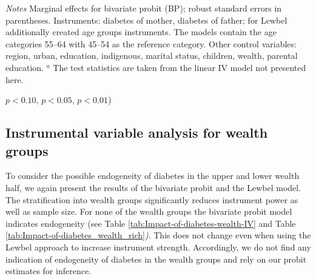 \begin{table}[ph]
\begin{center}
\begin{adjustbox}{max width=\textwidth, center}
\begin{threeparttable}
{\begin{tabular}{l*{4}{S S}}
\end{tabular}
\begin{tablenotes}
\item \textit{Notes}  Marginal effects for bivariate probit (BP); robust standard errors in parentheses. Instruments: diabetes of mother, diabetes of father; for Lewbel additionally created age groups instruments. The models contain the age categories 55--64 with 45--54 as the reference category. Other control variables: region, urban, education, indigenous, marital status, children, wealth, parental education. $^a$ The test statistics are taken from the linear IV model not presented here.
\item \sym{*} \(p<0.10\), \sym{**} \(p<0.05\), \sym{***} \(p<0.01\))
\end{tablenotes}
}
\end{threeparttable} 
\end{adjustbox}
\end{center}
\end{table}


\clearpage


\subsection*{Instrumental variable analysis for wealth groups}


To consider the possible endogeneity of diabetes in the upper and
lower wealth half, we again present the results of the bivariate probit
and the Lewbel model. The stratification into wealth groups significantly
reduces instrument power as well as sample size. For none of the wealth
groups the bivariate probit model indicates endogeneity (see Table
\ref{tab:Impact-of-diabetes-wealth-IV} and Table \ref{tab:Impact-of-diabetes_wealth_rich}\emph{)}.
This does not change even when using the Lewbel approach to increase
instrument strength. Accordingly, we do not find any indication of
endogeneity of diabetes in the wealth groups and rely on our probit
estimates for inference.

